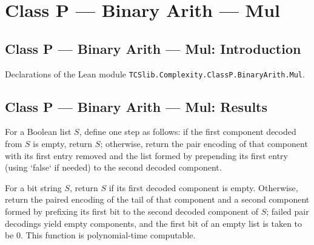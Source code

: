\section{Class P --- Binary Arith --- Mul}
\subsection*{Class P --- Binary Arith --- Mul: Introduction}

Declarations of the Lean module \texttt{TCSlib.Complexity.ClassP.BinaryArith.Mul}.

\subsection*{Class P --- Binary Arith --- Mul: Results}

\begin{definition}
\label{Complexity.BinArith.revStep}
\leanok
{}
For a Boolean list $S$, define one step as follows: if the first component decoded from
$S$ is empty, return $S$; otherwise, return the pair encoding of that component with its
first entry removed and the list formed by prepending its first entry (using `false` if
needed) to the second decoded component.
\end{definition}

\begin{theorem}
\label{Complexity.BinArith.polyTimeComputable_revStep}
\leanok
{}
For a bit string $S$, return $S$ if its first decoded component is empty. Otherwise,
return the paired encoding of the tail of that component and a second component formed
by prefixing its first bit to the second decoded component of $S$; failed pair decodings
yield empty components, and the first bit of an empty list is taken to be $0$. This
function is polynomial-time computable.
\end{theorem}

